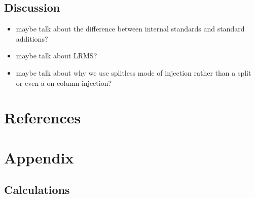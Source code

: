 \documentclass[a4paper, 12pt]{article}
\begin{document}
\subsection{Discussion}
\begin{itemize}
	\item maybe talk about the difference between internal standards and standard additions?
	\item maybe talk about LRMS?
	\item maybe talk about why we use splitless mode of injection rather than a split or even a on-column injection?
\end{itemize}


\section{References}
\printbibliography


\section{Appendix}

\subsection{Calculations}
\end{document}
